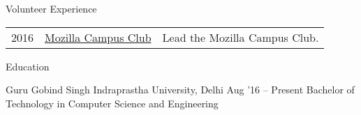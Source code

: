 \documentclass{resume} %
\begin{document}
\begin{rSection}{Volunteer Experience}
  \begin{tabular}{rll}
2016	     & {\href{https://github.com/moz-niec/}{Mozilla Campus Club}}  & Lead the Mozilla Campus Club.\\
\end{tabular}
\end{rSection}


\begin{rSection}{Education}
  \begin{rEducationSection}{Guru Gobind Singh Indraprastha University, Delhi}
                           {Aug '16 -- Present}
                           {Bachelor of Technology in Computer Science and Engineering}
  \end{rEducationSection}
\end{rSection}
\end{document}
